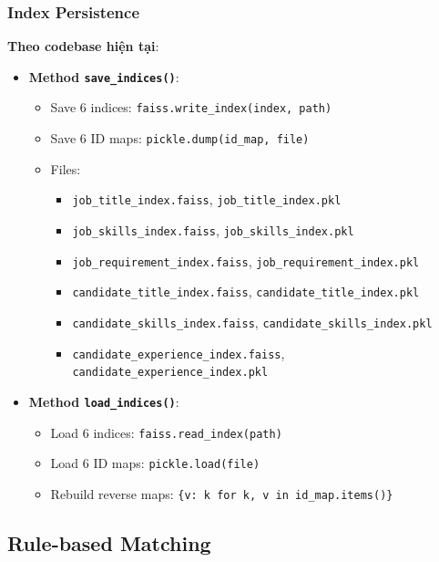 \subsubsection{Index Persistence}

\textbf{Theo codebase hiện tại}:

\begin{itemize}
    \item \textbf{Method \texttt{save\_indices()}}:
    \begin{itemize}
        \item Save 6 indices: \texttt{faiss.write\_index(index, path)}
        \item Save 6 ID maps: \texttt{pickle.dump(id\_map, file)}
        \item Files:
        \begin{itemize}
            \item \texttt{job\_title\_index.faiss}, \texttt{job\_title\_index.pkl}
            \item \texttt{job\_skills\_index.faiss}, \texttt{job\_skills\_index.pkl}
            \item \texttt{job\_requirement\_index.faiss}, \texttt{job\_requirement\_index.pkl}
            \item \texttt{candidate\_title\_index.faiss}, \texttt{candidate\_title\_index.pkl}
            \item \texttt{candidate\_skills\_index.faiss}, \texttt{candidate\_skills\_index.pkl}
            \item \texttt{candidate\_experience\_index.faiss}, \texttt{candidate\_experience\_index.pkl}
        \end{itemize}
    \end{itemize}
    
    \item \textbf{Method \texttt{load\_indices()}}:
    \begin{itemize}
        \item Load 6 indices: \texttt{faiss.read\_index(path)}
        \item Load 6 ID maps: \texttt{pickle.load(file)}
        \item Rebuild reverse maps: \texttt{\{v: k for k, v in id\_map.items()\}}
    \end{itemize}
\end{itemize}

\subsection{Rule-based Matching}

